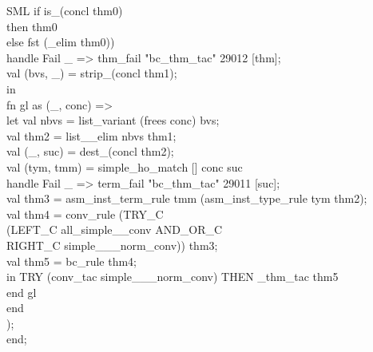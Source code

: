 \documentclass[11pt,a4paper]{article}
\begin{document}
\begin{GFT}{SML}
\+			if	is\_\PrLE{}(concl thm0)\\
\+			then	thm0\\
\+			else	fst (\PrKE{}\_elim thm0))\\
\+			handle Fail \_ => thm\_fail "bc\_thm\_tac" 29012 [thm];\\
\+		val (bvs, \_) =  strip\_\PrLF{}(concl thm1);\\
\+	in\\
\+	fn gl as (\_, conc) =>\\
\+	let	val nbvs = list\_variant (frees conc) bvs;\\
\+		val thm2 = list\_\PrLF{}\_elim nbvs thm1;\\
\+		val (\_, suc) = dest\_\PrLE{}(concl thm2);\\
\+		val (tym, tmm) = simple\_ho\_match [] conc suc\\
\+			handle Fail \_ => term\_fail "bc\_thm\_tac" 29011 [suc];\\
\+		val thm3 = asm\_inst\_term\_rule tmm (asm\_inst\_type\_rule tym thm2);\\
\+		val thm4 = conv\_rule (TRY\_C\\
\+				(LEFT\_C all\_simple\_\PrMC{}\_conv AND\_OR\_C\\
\+					RIGHT\_C simple\_\PrMC{}\_\PrMI{}\_norm\_conv)) thm3;\\
\+		val thm5 = bc\_rule thm4;\\
\+	in	TRY (conv\_tac simple\_\PrMC{}\_\PrMI{}\_norm\_conv) THEN \PrLE{}\_thm\_tac thm5\\
\+	end	gl\\
\+	end\\
\+);\\
\+end;\\
\end{GFT}
\end{document}
